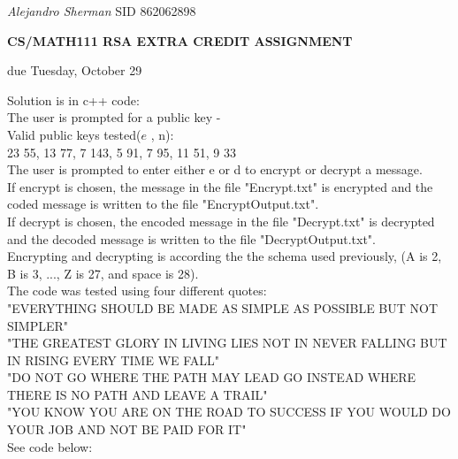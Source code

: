 \documentclass{article}
\begin{document}
\noindent
\emph{\large Alejandro Sherman} \large SID 862062898

\vskip 0.2in

\centerline{\large \bf CS/MATH111 RSA EXTRA CREDIT ASSIGNMENT}
\centerline{due Tuesday, October 29}

\vskip 0.1in


\vskip 0.2in
\vskip 0.2in



\begin{solution}
Solution is in c++ code:\\
The user is prompted for a public key - \\
Valid public keys tested($e$ , n):\\
23 55, 13 77, 7 143, 5 91, 7 95, 11 51, 9 33\\
The user is prompted to enter either e or d to encrypt or decrypt a message.\\
If encrypt is chosen, the message in the file "Encrypt.txt" is encrypted and the coded message is written to the file "EncryptOutput.txt".\\
If decrypt is chosen, the encoded message in the file "Decrypt.txt" is decrypted and the decoded message is written to the file "DecryptOutput.txt".\\
Encrypting and decrypting is according the the schema used previously, (A is 2, B is 3, ..., Z is 27, and space is 28).\\
The code was tested using four different quotes:\\
"EVERYTHING SHOULD BE MADE AS SIMPLE AS POSSIBLE BUT NOT SIMPLER"\\
"THE GREATEST GLORY IN LIVING LIES NOT IN NEVER FALLING BUT IN RISING EVERY TIME WE FALL"\\
"DO NOT GO WHERE THE PATH MAY LEAD GO INSTEAD WHERE THERE IS NO PATH AND LEAVE A TRAIL"\\
"YOU KNOW YOU ARE ON THE ROAD TO SUCCESS IF YOU WOULD DO YOUR JOB AND NOT BE PAID FOR IT"\\
See code below:\\

\end{solution}
\end{document}
